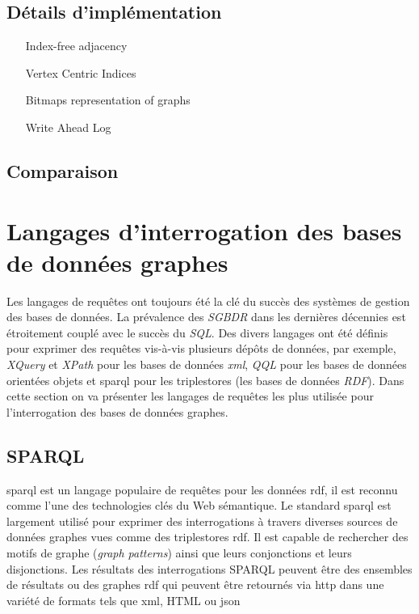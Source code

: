   \newpage
  \subsection{Détails d'implémentation}
  \label{graph-internals}
  \begin{itemize}
  \item [Index-free adjacency]
  \item [Vertex Centric Indices]
  \item [Bitmaps representation of graphs]
  \item [Write Ahead Log]
  \end{itemize}

  \subsection{Comparaison}
  \label{graphdb-comp}

\newpage
\section{Langages d'interrogation des bases de données graphes}
\label{query-languages}

Les langages de requêtes ont toujours été la clé du succès des
systèmes de gestion des bases de données. La prévalence des
\emph{\acrshort{SGBDR}} dans les dernières décennies est étroitement
couplé avec le succès du \emph{SQL}. Des divers langages ont été
définis pour exprimer des requêtes vis-à-vis plusieurs dépôts de
données, par exemple, \emph{XQuery} \cite{boag2002xquery} et
\emph{XPath} \cite{clark1999xml} pour les bases de données
\emph{\acrshort{xml}}, \emph{QQL} \cite{alashqur1989oql} pour les
bases de données orientées objets et \acrshort{sparql}
\cite{prud2008sparql} pour les triplestores (les bases de données
\emph{RDF}). Dans cette section on va présenter les langages de
requêtes les plus utilisée pour l'interrogation des bases de données
graphes.

  \subsection{SPARQL}
  \label{sec:sparql}

  \acrshort{sparql} \cite{prud2008sparql} est un langage populaire de
  requêtes pour les données \acrshort{rdf}, il est reconnu comme l'une
  des technologies clés du Web sémantique. Le standard
  \acrshort{sparql} est largement utilisé pour exprimer des
  interrogations à travers diverses sources de données graphes vues
  comme des triplestores \acrshort{rdf}. Il est capable de rechercher
  des motifs de graphe (\emph{graph patterns}) ainsi que leurs
  conjonctions et leurs disjonctions. Les résultats des interrogations
  \textsc{SPARQL} peuvent être des ensembles de résultats ou des
  graphes \acrshort{rdf} qui peuvent être retournés via
  \acrshort{http} dans une variété de formats tels que \acrshort{xml},
  HTML ou \acrshort{json}

